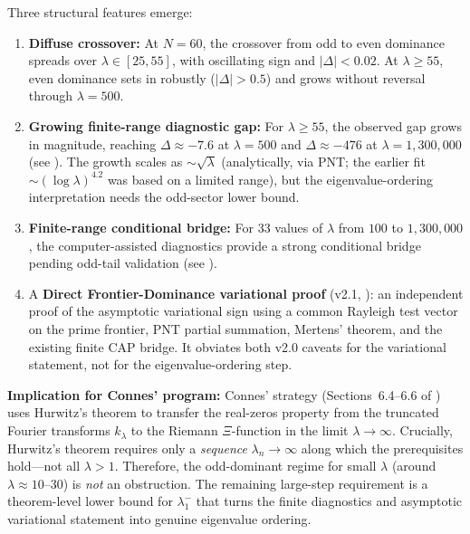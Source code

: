 \documentclass[12pt,a4paper]{article}
\theoremstyle{definition}
\theoremstyle{remark}
\begin{document}
Three structural features emerge:

\begin{enumerate}
  \item \textbf{Diffuse crossover:} At $N=60$, the crossover from odd to even dominance spreads over $\lambda \in [25, 55]$, with oscillating sign and $|\Delta| < 0.02$. At $\lambda \geq 55$, even dominance sets in robustly ($|\Delta| > 0.5$) and grows without reversal through $\lambda = 500$.

  \item \textbf{Growing finite-range diagnostic gap:} For $\lambda \geq 55$, the observed gap grows in magnitude, reaching $\Delta \approx -7.6$ at $\lambda = 500$ and $\Delta \approx -476$ at $\lambda = 1{,}300{,}000$ (see ). The growth scales as $\sim\!\sqrt{\lambda}$ (analytically, via PNT; the earlier fit $\sim\!(\log\lambda)^{4.2}$ was based on a limited range), but the eigenvalue-ordering interpretation needs the odd-sector lower bound.

  \item \textbf{Finite-range conditional bridge:} For $33$ values of $\lambda$ from $100$ to $1{,}300{,}000$, the computer-assisted diagnostics provide a strong conditional bridge pending odd-tail validation (see ).

  \item A \textbf{Direct Frontier-Dominance variational proof} (v2.1, ): an independent proof of the asymptotic variational sign using a common Rayleigh test vector on the prime frontier, PNT partial summation, Mertens' theorem, and the existing finite CAP bridge. It obviates both v2.0 caveats for the variational statement, not for the eigenvalue-ordering step.
\end{enumerate}

\textbf{Implication for Connes' program:} Connes' strategy (Sections~6.4--6.6 of \cite{Connes2026}) uses Hurwitz's theorem to transfer the real-zeros property from the truncated Fourier transforms $\hat{k}_\lambda$ to the Riemann $\Xi$-function in the limit $\lambda \to \infty$. Crucially, Hurwitz's theorem requires only a \emph{sequence} $\lambda_n \to \infty$ along which the prerequisites hold---not all $\lambda > 1$. Therefore, the odd-dominant regime for small $\lambda$ (around $\lambda \approx 10$--$30$) is \emph{not} an obstruction. The remaining large-step requirement is a theorem-level lower bound for $\lambda_1^-$ that turns the finite diagnostics and asymptotic variational statement into genuine eigenvalue ordering.
\end{document}
